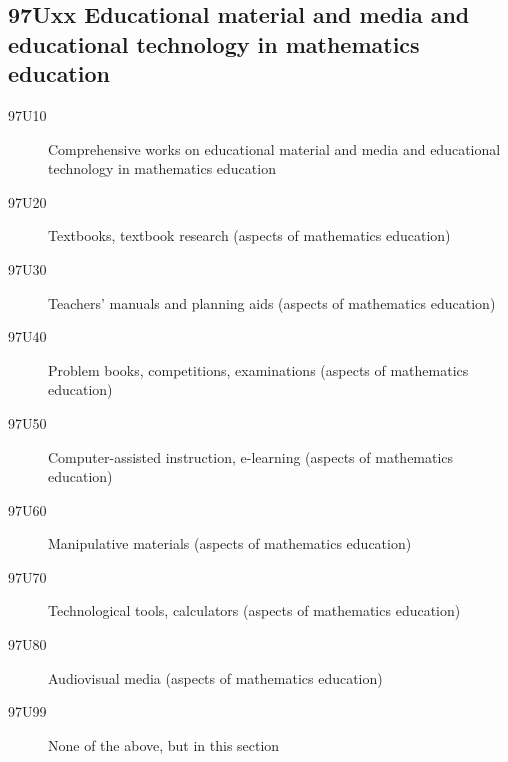 \subsection*{97Uxx  Educational material and media and educational technology in mathematics education}\label{97Uxx}
\begin{description}  
\item [97U10]\label{97U10} Comprehensive works on educational material and media and educational technology in mathematics education
\item [97U20]\label{97U20} Textbooks, textbook research (aspects of mathematics education)
\item [97U30]\label{97U30} Teachers' manuals and planning aids (aspects of mathematics education)
\item [97U40]\label{97U40} Problem books, competitions, examinations (aspects of mathematics education)
\item [97U50]\label{97U50} Computer-assisted instruction, e-learning (aspects of mathematics education)
\item [97U60]\label{97U60} Manipulative materials (aspects of mathematics education)
\item [97U70]\label{97U70} Technological tools, calculators (aspects of mathematics education)
\item [97U80]\label{97U80} Audiovisual media (aspects of mathematics education)
\item [97U99]\label{97U99} None of the above, but in this section

\end{description}

